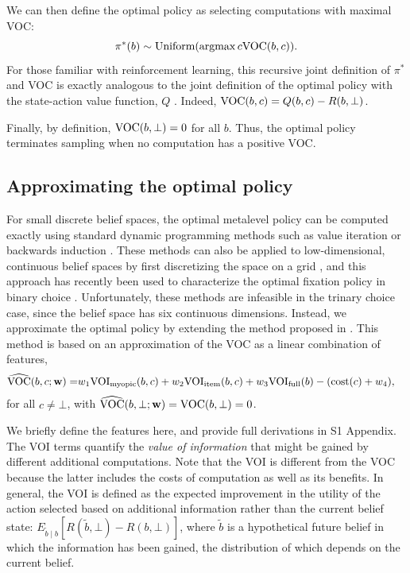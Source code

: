 We can then define the optimal policy as selecting computations with maximal VOC:
$$
\pi^*(b) \sim \text{Uniform}(\operatorname*{argmax}{c} \text{VOC}(b, c)).
$$
For those familiar with reinforcement learning, this recursive joint definition of $\pi^*$ and VOC is exactly analogous to the joint definition of the optimal policy with the state-action value function, $Q$ \citep{sutton2018reinforcement}. Indeed, $\text{VOC}(b, c) = Q(b, c) - R(b, \bot)$. 

Finally, by definition, $\text{VOC}(b,\bot)=0$ for all $b$. Thus, the optimal policy terminates sampling when no computation has a positive VOC.


\subsection{Approximating the optimal policy}

For small discrete belief spaces, the optimal metalevel policy can be computed
exactly using standard dynamic programming methods such as value iteration
or backwards induction \citep{callaway2022rational}. These methods can also be applied to low-dimensional, continuous belief spaces by first discretizing the space on a grid \citep{tajima2019optimal}, and this approach has recently been used to characterize the optimal fixation policy in binary choice \citep{jang2021optimal}. Unfortunately, these methods are infeasible in the trinary choice case, since the belief space has six continuous dimensions. Instead, we approximate the optimal policy by extending the method proposed in \citep{callaway2018learning}. This method is based on an approximation of the VOC as a linear combination of features,
\begin{equation}\label{eq:vochat}
  \begin{aligned}
    \widehat{\text{VOC}}(b, c; \mathbf{w}) =& w_{1}\text{VOI}_\text{myopic}(b,c)+w_{2}\text{VOI}_\text{item}(b,c) +
     w_{3}\text{VOI}_\text{full}(b) -(\text{cost}(c)+w_{4}),
  \end{aligned}
\end{equation}
for all $c\neq\bot$, with $\widehat{\text{VOC}}(b, \bot; \mathbf{w}) = \text{VOC}(b,\bot)=0$.

We briefly define the features here, and provide full derivations in S1 Appendix. The VOI terms quantify the \textit{value of information} \citep{howard1966information} that might be gained by different additional computations. Note that the VOI is different from the VOC because the latter includes the costs of computation as well as its benefits. In general, the VOI is defined as the expected improvement in the utility of the action selected based on additional information rather than the current belief state: $E_{\tilde{b} \mid b}[R(\tilde{b}, \bot) - R(b, \bot)]$, where $\tilde{b}$ is a hypothetical future belief in which the information has been gained, the distribution of which depends on the current belief.


